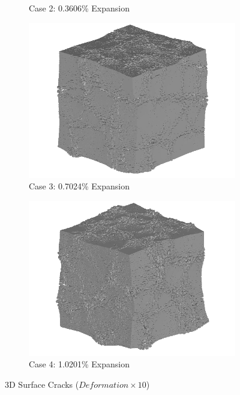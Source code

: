 \begin{figure}[!h]
\begin{subfigure}{.5\textwidth}
    \caption{Case 2: 0.3606\% Expansion}
    \end{subfigure}%
    \begin{subfigure}{.5\textwidth}
      \centering
      \includegraphics[width=.8\linewidth]{Files/exp_3D/ASR/A30P25_3_3d.png}
    \caption{Case 3: 0.7024\% Expansion}
    \end{subfigure}
    \begin{subfigure}{.5\textwidth}
      \centering
      \includegraphics[width=.8\linewidth]{Files/exp_3D/ASR/A30P25_4_3d.png}
    \caption{Case 4: 1.0201\% Expansion}
    \end{subfigure}%


  \caption{3D Surface Cracks ($Deformation \times 10$)}
  \label{fig:ASR_A30P25_3D}
\end{figure}

